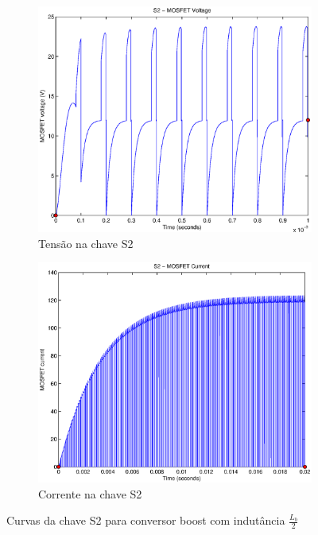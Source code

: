 \documentclass{article}
\begin{document}
\begin{figure}[H]
	\centering
	\begin{subfigure}[b]{0.4\linewidth}
		\includegraphics[width=\linewidth]{matlab/boost/r_s2v2}
		\caption{Tensão na chave S2}
	\end{subfigure}
	\begin{subfigure}[b]{0.4\linewidth}
		\centering
		\includegraphics[width=\linewidth]{matlab/boost/r_s2i2}
		\caption{Corrente na chave S2}
	\end{subfigure}
	\caption{Curvas da chave S2 para conversor boost com indutância $\frac{L_b}{2}$}
	\label{fig:bos22}
\end{figure}
\end{document}
